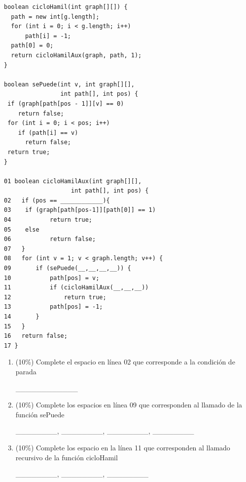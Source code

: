 \documentclass[twocolumn]{article}
\begin{document}
\begin{verbatim}
boolean cicloHamil(int graph[][]) {
  path = new int[g.length];
  for (int i = 0; i < g.length; i++)
      path[i] = -1;
  path[0] = 0;
  return cicloHamilAux(graph, path, 1);
}

boolean sePuede(int v, int graph[][], 
                int path[], int pos) {
 if (graph[path[pos - 1]][v] == 0)
    return false;
 for (int i = 0; i < pos; i++)
    if (path[i] == v)
      return false; 
 return true;
}
  
01 boolean cicloHamilAux(int graph[][], 
                   int path[], int pos) {  
02   if (pos == ____________){     
03    if (graph[path[pos-1]][path[0]] == 1)
04           return true;
05    else
06           return false;
07   }
08   for (int v = 1; v < graph.length; v++) {        
09       if (sePuede(__,__,__,__)) {
10           path[pos] = v;
11           if (cicloHamilAux(__,__,__))
12               return true;
13           path[pos] = -1;
14       }
15   }
16   return false;
17 }
\end{verbatim}


\begin{enumerate}[label=\Alph*]


    \item (10\%) Complete el espacio en línea 02 que corresponde a la condición de parada


  \_\_\_\_\_\_\_\_\_\_\_\_


    \item (10\%) Complete los espacios en línea 09 que corresponden al llamado de la función sePuede


  \_\_\_\_\_\_\_\_, \_\_\_\_\_\_\_\_, \_\_\_\_\_\_\_\_, \_\_\_\_\_\_\_\_


    \item (10\%) Complete los espacio en la línea 11 que corresponden al llamado recursivo de la función cicloHamil


  \_\_\_\_\_\_\_\_, \_\_\_\_\_\_\_\_, \_\_\_\_\_\_\_\_



\end{enumerate}

  
\end{document}
